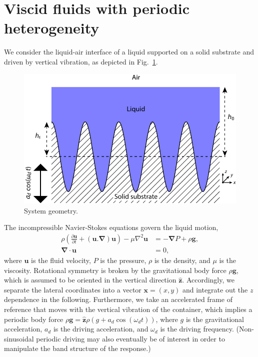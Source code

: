 \documentclass[aps,pre,amsmath,amssymb,floatfix,onecolumn,notitlepage,10pt]{revtex4-1}
\begin{document}
\section{Viscid fluids with periodic heterogeneity}
We consider the liquid-air interface of a liquid supported on a solid substrate and driven by vertical vibration, as depicted in Fig.~\ref{fig1}.
\begin{figure}
\includegraphics[width=0.5\columnwidth]{diagram_driven}
\caption{System geometry. \label{fig1}}
\end{figure}
The incompressible Navier-Stokes equations govern the liquid motion,
\begin{align}
\rho \left(\frac{\partial \mathbf{u}}{\partial t} + (\mathbf{u}.\bm{\nabla})\mathbf{u}\right) - \mu \nabla^2 \mathbf{u} &= -\bm{\nabla}P + \rho \mathbf{g}, \label{ns} \\
\bm{\nabla} \cdot \mathbf{u} &= 0, \label{incompressible}
\end{align}
where $\mathbf{u}$ is the fluid velocity, $P$ is the pressure, $\rho$ is the density, and $\mu$ is the viscosity. Rotational symmetry is broken by the gravitational body force $\rho\mathbf{g}$, which is assumed to be oriented in the vertical direction $\hat{\mathbf{z}}$. Accordingly, we separate the lateral coordinates into a vector $\mathbf{x}=(x,y)$ and integrate out the $z$ dependence in the following. Furthermore, we take an accelerated frame of reference that moves with the vertical vibration of the container, which implies a periodic body force $\rho \mathbf{g} = \hat{\mathbf{z}}\rho (g + a_d\cos(\omega_d t))$, where $g$ is the gravitational acceleration, $a_d$ is the driving acceleration, and $\omega_d$ is the driving frequency. (Non-sinusoidal periodic driving may also eventually be of interest in order to manipulate the band structure of the response.)
\end{document}
